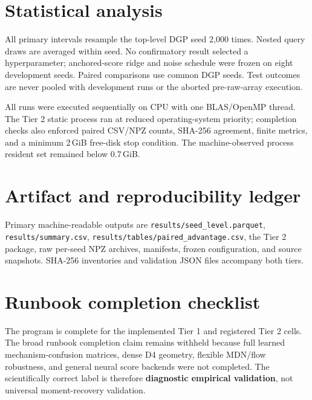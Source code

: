 \documentclass[11pt]{article}
\newcommand{\artifact}[1]{\nolinkurl{#1}}
\begin{document}
\section{Statistical analysis}

All primary intervals resample the top-level DGP seed 2,000 times.  Nested query
draws are averaged within seed.  No confirmatory result selected a hyperparameter;
anchored-score ridge and noise schedule were frozen on eight development seeds.
Paired comparisons use common DGP seeds.  Test outcomes are never pooled with
development runs or the aborted pre-raw-array execution.


All runs were executed sequentially on CPU with one BLAS/OpenMP thread.  The
Tier 2 static process ran at reduced operating-system priority; completion checks
also enforced paired CSV/NPZ counts, SHA-256 agreement, finite metrics, and a
minimum 2\,GiB free-disk stop condition.  The machine-observed process resident
set remained below 0.7\,GiB.

\section{Artifact and reproducibility ledger}


Primary machine-readable outputs are \artifact{results/seed_level.parquet},
\artifact{results/summary.csv}, \artifact{results/tables/paired_advantage.csv},
the Tier 2 package, raw per-seed NPZ archives, manifests, frozen configuration, and
source snapshots.  SHA-256 inventories and validation JSON files accompany both
tiers.

\section{Runbook completion checklist}


The program is complete for the implemented Tier 1 and registered Tier 2 cells.
The broad runbook completion claim remains withheld because full learned
mechanism-confusion matrices, dense D4 geometry, flexible MDN/flow robustness, and
general neural score backends were not completed.  The scientifically correct
label is therefore \textbf{diagnostic empirical validation}, not universal
moment-recovery validation.
\end{document}
